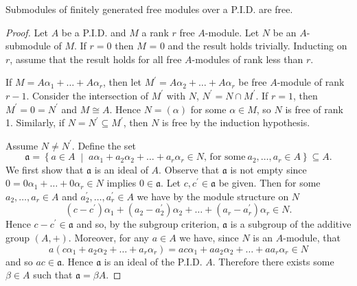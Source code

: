 \documentclass[10pt]{amsart}
\begin{document}
\begin{lem}
  Submodules of finitely generated free modules over a P.I.D. are free.

  \begin{proof}
    Let $A$ be a P.I.D. and $M$ a rank $r$ free $A$-module.
    Let $N$ be an $A$-submodule of $M$.
    If $r = 0$ then $M$ = 0 and the result holds trivially.
    Inducting on $r$, assume that the result holds for all free $A$-modules of rank less than $r$.
    
    If $M = A\alpha_1 + \ldots + A\alpha_r$, then let $M^\prime = A\alpha_2 + \ldots + A\alpha_r$ be free $A$-module of rank $r-1$.
    Consider the intersection of $M^\prime$ with $N$, $N^\prime = N \cap M^\prime$.
    If $r = 1$, then $M^\prime = 0 = N^\prime$ and $M \cong A$.
    Hence $N = (\alpha)$ for some $\alpha \in M$, so $N$ is free of rank 1.
    Similarly, if $N = N^\prime \subseteq M^\prime$, then $N$ is free by the induction hypothesis.
    
    Assume $N \neq N^\prime$.
    Define the set 
    $$\mathfrak{a} = \left\{ a \in A \;\middle\vert\; a\alpha_1 + a_2\alpha_2 + \ldots + a_r\alpha_r \in N,\, \text{for some}\ a_2, \ldots, a_r \in A\right\} \subseteq A.$$
    We first show that $\mathfrak{a}$ is an ideal of $A$.
    Observe that $\mathfrak{a}$ is not empty since $0 = 0\alpha_1 + \ldots + 0\alpha_r \in N$ implies $0 \in \mathfrak{a}$.
    Let $c, c^\prime \in \mathfrak{a}$ be given.
    Then for some $a_2, \ldots, a_r \in A$ and $a_2^\prime, \ldots, a_r^\prime \in A$ we have by the module structure on $N$
    $$(c - c^\prime)\alpha_1 + (a_2 - a_2^\prime)\alpha_2 + \ldots + (a_r - a_r^\prime)\alpha_r \in N.$$
    Hence $c - c^\prime \in \mathfrak{a}$ and so, by the subgroup criterion, $\mathfrak{a}$ is a subgroup of the additive group $(A, +)$.
    Moreover, for any $a \in A$ we have, since $N$ is an $A$-module, that 
    $$a(c\alpha_1 + a_2\alpha_2 + \ldots + a_r\alpha_r) = ac\alpha_1 + aa_2\alpha_2 + \ldots + aa_r\alpha_r \in N$$
    and so $ac \in \mathfrak{a}$.
    Hence $\mathfrak{a}$ is an ideal of the P.I.D. $A$.
    Therefore there exists some $\beta \in A$ such that $\mathfrak{a} = \beta A$.
    

\end{proof}
\end{lem}
\end{document}
